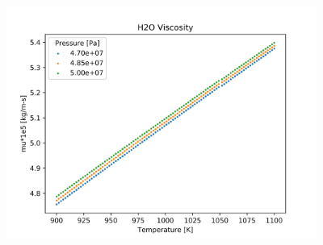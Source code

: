 \begin{figure}[h]
    \centering
    \includegraphics[width=4in]{../images/property_plots/H2O_Viscosity.png}
\end{figure}
